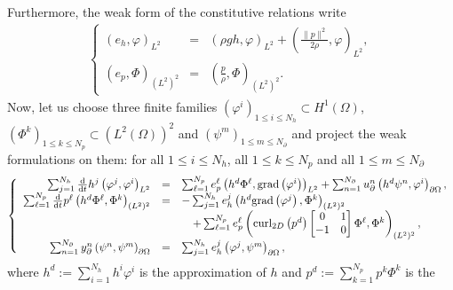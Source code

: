 \documentclass[letterpaper,10pt,english]{sphinxmanual}
\begin{document}
\sphinxAtStartPar
Furthermore, the weak form of the constitutive relations write
\begin{equation*}
\begin{split}\left\lbrace
\begin{array}{rcl}
\left( e_h, \varphi \right)_{L^2} &=& \left( \rho g h, \varphi \right)_{L^2} + \left( \frac{\| p \|^2}{2 \rho}, \varphi \right)_{L^2}, \\
\left( e_p, \Phi \right)_{(L^2)^2} &=& \left( \frac{p}{\rho}, \Phi \right)_{(L^2)^2}.
\end{array}
\right.\end{split}
\end{equation*}
\sphinxAtStartPar
Now, let us choose three finite families
\((\varphi^i)_{1 \le i \le N_h} \subset H^1(\Omega)\),
\((\Phi^k)_{1 \le k \le N_p} \subset (L^2(\Omega))^2\) and
\((\psi^m)_{1 \le m \le N_\partial}\) and project the weak
formulations on them: for all \(1 \le i \le N_h\), all
\(1 \le k \le N_p\) and all \(1 \le m \le N_\partial\)
\begin{equation*}
\begin{split}\left\lbrace
\begin{array}{rcl}
\sum_{j=1}^{N_h} \frac{\rm d}{{\rm d}t} h^j \left( \varphi^j, \varphi^i \right)_{L^2} &=& \sum_{\ell=1}^{N_p} e_p^\ell \left( h^d \Phi^\ell, {\rm grad} \left( \varphi^i \right) \right)_{L^2} + \sum_{n=1}^{N_\partial} u_\partial^n \left( h^d \psi^n, \varphi^i \right)_{\partial\Omega}, \\
\sum_{\ell=1}^{N_p} \frac{\rm d}{{\rm d}t} p^\ell \left( h^d \Phi^\ell, \Phi^k \right)_{(L^2)^2} &=& - \sum_{j=1}^{N_h} e_h^j \left( h^d {\rm grad} \left( \varphi^j \right), \Phi^k \right)_{(L^2)^2} \\
                       && \quad + \sum_{\ell=1}^{N_p} e_p^\ell \left( {\rm curl}_{2D}\left( p^d \right) \begin{bmatrix} 0 & 1 \\ -1 & 0 \end{bmatrix} \Phi^\ell, \Phi^k \right)_{(L^2)^2}, \\
\sum_{n=1}^{N_\partial} y_\partial^n \left( \psi^n, \psi^m \right)_{\partial\Omega} &=& \sum_{j=1}^{N_h} e_h^j \left( \varphi^j, \psi^m \right)_{\partial\Omega},
\end{array}
\right.\end{split}
\end{equation*}
\sphinxAtStartPar
where \(h^d := \sum_{i=1}^{N_h} h^i \varphi^i\) is the approximation
of \(h\) and \(p^d := \sum_{k=1}^{N_p} p^k \Phi^k\) is the
\end{document}

